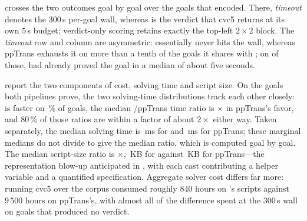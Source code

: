  crosses the two outcomes goal by goal over the goals that \beer{} encoded.
There, \emph{timeout} denotes the \(300\)\,s per-goal wall, whereas  is the verdict that cvc5 returns at its own \(5\)\,s budget; verdict-only scoring retains exactly the top-left \(2\times2\) block.
The \emph{timeout} row and column are asymmetric: \beer{} essentially never hits the wall, whereas ppTrans exhausts it on more than a tenth of the goals it shares with \beer{}; on \bmBeerWinsPptKilled{} of those, \beer{} had already proved the goal in a median of about five seconds.

 report the two components of cost, solving time and script size.
On the \bmBothCount{} goals both pipelines prove, the two solving-time distributions track each other closely: \beer{} is faster on \bmBeerFaster\,\% of goals, the median \beer{}/ppTrans time ratio is \bmRatioMed\(\times\) in ppTrans's favor, and \(80\,\%\) of those ratios are within a factor of about \(2\times\) either way.
Taken separately, the median solving time is \bmBeerMed{}\,ms for \beer{} and \bmPptMed{}\,ms for ppTrans; these marginal medians do not divide to give the median ratio, which is computed goal by goal.
The median script-size ratio is \bmSizeMed\(\times\), \bmBeerSizeMed{}\,KB for \beer{} against \bmPptSizeMed{}\,KB for ppTrans---the representation blow-up anticipated in , with each cast contributing a helper variable and a quantified specification.
Aggregate solver cost differs far more: running cvc5 over the corpus consumed roughly \(840\) hours on \beer{}'s scripts against \(9\,500\) hours on ppTrans's, with almost all of the difference spent at the \(300\)\,s wall on goals that produced no verdict.


